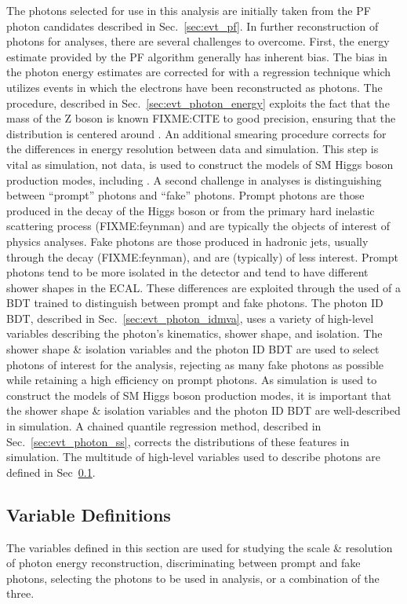 The photons selected for use in this analysis are initially taken from the PF photon candidates described in Sec.~\ref{sec:evt_pf}.
In further reconstruction of photons for \Hgg analyses, there are several challenges to overcome.
First, the energy estimate provided by the PF algorithm generally has inherent bias.
The bias in the photon energy estimates are corrected for with a regression technique which utilizes \Zee events in which the electrons have been reconstructed as photons.
The procedure, described in Sec.~\ref{sec:evt_photon_energy} exploits the fact that the mass of the Z boson is known FIXME:CITE to good precision, ensuring that the \mee distribution is centered around \mZ.
An additional smearing procedure corrects for the differences in energy resolution between data and simulation.
This step is vital as simulation, not data, is used to construct the models of SM Higgs boson production modes, including \ttH.
A second challenge in \Hgg analyses is distinguishing between ``prompt'' photons and ``fake'' photons.
Prompt photons are those produced in the decay of the Higgs boson or from the primary hard inelastic scattering process (FIXME:feynman) and are typically the objects of interest of physics analyses.
Fake photons are those produced in hadronic jets, usually through the decay \Pigg (FIXME:feynman), and are (typically) of less interest.
Prompt photons tend to be more isolated in the detector and tend to have different shower shapes in the ECAL.
These differences are exploited through the used of a BDT trained to distinguish between prompt and fake photons.
The photon ID BDT, described in Sec.~\ref{sec:evt_photon_idmva}, uses a variety of high-level variables describing the photon's kinematics, shower shape, and isolation.
The shower shape \& isolation variables and the photon ID BDT are used to select photons of interest for the \ttH analysis, rejecting as many fake photons as possible while retaining a high efficiency on prompt photons.
As simulation is used to construct the models of SM Higgs boson production modes, it is important that the shower shape \& isolation variables and the photon ID BDT are well-described in simulation.
A chained quantile regression method, described in Sec.~\ref{sec:evt_photon_ss}, corrects the distributions of these features in simulation.
The multitude of high-level variables used to describe photons are defined in Sec~\ref{sec:evt_photon_vardef}.
 
\subsection{Variable Definitions} \label{sec:evt_photon_vardef}
The variables defined in this section are used for studying the scale \& resolution of photon energy reconstruction, discriminating between prompt and fake photons, selecting the photons to be used in analysis, or a combination of the three.

